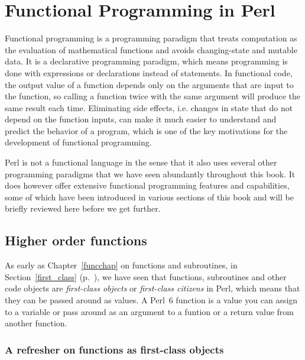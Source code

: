 \chapter{Functional Programming in Perl}
\label{functional programming}

Functional programming is a programming paradigm that treats 
computation as the evaluation of mathematical functions 
and avoids changing-state and mutable data. It is a 
declarative programming paradigm, which means programming 
is done with expressions or declarations instead of 
statements. In functional code, the output value of a function 
depends only on the arguments that are input to the function, 
so calling a function twice with the same argument will produce the 
same result each time. Eliminating side effects, i.e. changes 
in state that do not depend on the function inputs, can make 
it much easier to understand and predict the behavior of a 
program, which is one of the key motivations for the 
development of functional programming.

Perl is not a functional language in the sense that it  
also uses several other programming paradigms that we have seen 
abundantly throughout this book. It does however 
offer extensive functional programming features and 
capabilities, some of which have been introduced in 
various sections of this book and will be briefly 
reviewed here before we get further.

\section{Higher order functions}

As early as Chapter~\ref{funcchap} on functions and 
subroutines, in Section~\ref{first_class} 
(p.~\pageref{first_class}), we have seen that functions,  
subroutines and other code objects are \emph{first-class 
objects} or \emph{first-class citizens} in Perl, which 
means that they can be passed around as values. A Perl~6 
function is a value you can assign to a variable or pass 
around as an argument to a funtion or a return value from 
another function.

\subsection{A refresher on functions as first-class objects}
\label{fco-refresher}

